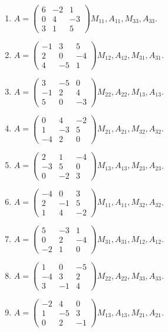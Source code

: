 \begin{enumerate}[label=\arabic*.,  leftmargin=*]
\item $A=\begin{pmatrix}6&-2&1\\0&4&-3\\3&1&5\end{pmatrix}$\quad $M_{11}, A_{11}, M_{33}, A_{33}$.
\item $A=\begin{pmatrix}-1&3&5\\2&0&-4\\4&-5&1\end{pmatrix}$\quad $M_{12}, A_{12}, M_{31}, A_{31}$.
\item $A=\begin{pmatrix}3&-5&0\\-1&2&4\\5&0&-3\end{pmatrix}$\quad $M_{22}, A_{22}, M_{13}, A_{13}$.
\item $A=\begin{pmatrix}0&4&-2\\1&-3&5\\-4&2&0\end{pmatrix}$\quad $M_{21}, A_{21}, M_{32}, A_{32}$.
\item $A=\begin{pmatrix}2&1&-4\\-3&5&0\\0&-2&3\end{pmatrix}$\quad $M_{13}, A_{13}, M_{23}, A_{23}$.
\item $A=\begin{pmatrix}-4&0&3\\2&-1&5\\1&4&-2\end{pmatrix}$\quad $M_{11}, A_{11}, M_{32}, A_{32}$.
\item $A=\begin{pmatrix}5&-3&1\\0&2&-4\\-2&1&0\end{pmatrix}$\quad $M_{31}, A_{31}, M_{12}, A_{12}$.
\item $A=\begin{pmatrix}1&0&-5\\-4&3&2\\3&-1&4\end{pmatrix}$\quad $M_{22}, A_{22}, M_{33}, A_{33}$.
\item $A=\begin{pmatrix}-2&4&0\\1&-5&3\\0&2&-1\end{pmatrix}$\quad $M_{13}, A_{13}, M_{21}, A_{21}$.

\end{enumerate}
